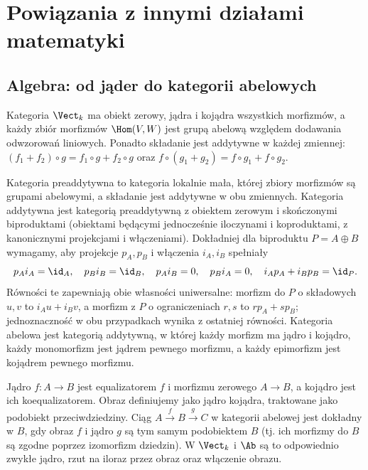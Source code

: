 \section{Powiązania z innymi działami matematyki}\label{sec:powiazania}
\providecommand{\atlasref}[2]{#2}

\subsection{Algebra: od jąder do kategorii abelowych}

Kategoria $\Vect_k$ ma obiekt zerowy, jądra i kojądra wszystkich morfizmów, a każdy zbiór morfizmów $\Hom(V,W)$ jest grupą abelową względem dodawania odwzorowań liniowych. Ponadto składanie jest addytywne w każdej zmiennej:
$(f_1+f_2)\circ g=f_1\circ g+f_2\circ g$ oraz $f\circ(g_1+g_2)=f\circ g_1+f\circ g_2$.

\begin{definicja}\label{cat:def:abelian-category}
Kategoria preaddytywna to kategoria lokalnie mała, której zbiory morfizmów są grupami abelowymi, a składanie jest addytywne w obu zmiennych. Kategoria addytywna jest kategorią preaddytywną z obiektem zerowym i skończonymi biproduktami (obiektami będącymi jednocześnie iloczynami i koproduktami, z kanonicznymi projekcjami i włączeniami). Dokładniej dla biproduktu $P=A\oplus B$ wymagamy, aby projekcje $p_A,p_B$ i włączenia $i_A,i_B$ spełniały
\[
p_Ai_A=\id_A,\quad p_Bi_B=\id_B,\quad
p_Ai_B=0,\quad p_Bi_A=0,\quad
i_Ap_A+i_Bp_B=\id_P.
\]
Równości te zapewniają obie własności uniwersalne: morfizm do $P$ o składowych $u,v$ to $i_Au+i_Bv$, a morfizm z $P$ o ograniczeniach $r,s$ to $rp_A+sp_B$; jednoznaczność w obu przypadkach wynika z ostatniej równości. Kategoria abelowa jest kategorią addytywną, w której każdy morfizm ma jądro i kojądro, każdy monomorfizm jest jądrem pewnego morfizmu, a każdy epimorfizm jest kojądrem pewnego morfizmu.
\end{definicja}
Jądro $f:A\to B$ jest equalizatorem $f$ i morfizmu zerowego $A\to B$, a kojądro jest ich koequalizatorem. Obraz definiujemy jako jądro kojądra, traktowane jako podobiekt przeciwdziedziny. Ciąg $A\xrightarrow{f}B\xrightarrow{g}C$ w kategorii abelowej jest dokładny w $B$, gdy obraz $f$ i jądro $g$ są tym samym podobiektem $B$ (tj. ich morfizmy do $B$ są zgodne poprzez izomorfizm dziedzin). W $\Vect_k$ i $\Ab$ są to odpowiednio zwykłe jądro, rzut na iloraz przez obraz oraz włączenie obrazu.

